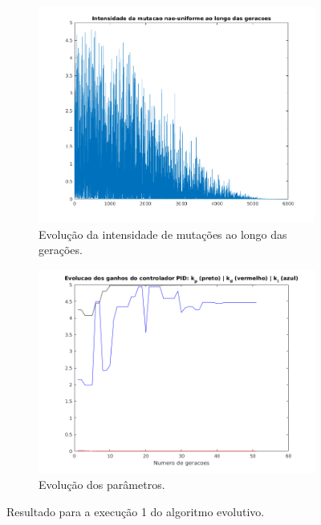 \begin {enumerate}
\begin{figure}[h!]
		\begin{subfigure}{.5\textwidth}
		  \centering
		  \includegraphics[width=1\linewidth]{pid/mutacao_pid_ex_c}
		  \caption{\centering Evolução da intensidade de mutações ao longo das
		  gerações.}
		  \label{fig:pid_mutacao_c}
		\end{subfigure}%
		\begin{subfigure}{.5\textwidth}
		  \centering
		  \includegraphics[width=1\linewidth]{pid/kp_kd_ki_pid_ex_c}
		  \caption{\centering Evolução dos parâmetros.}
		  \label{fig:pid_parametros_c} 
		\end{subfigure}
	
	\caption{Resultado para a execução 1 do algoritmo evolutivo.}
	\end{figure}
	

\end{enumerate}
